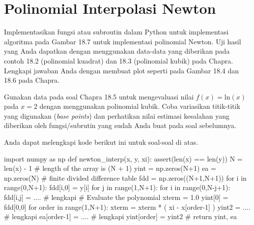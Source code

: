 \section{Polinomial Interpolasi Newton}

\begin{soal}
Implementasikan fungsi atau subroutin dalam Python untuk implementasi algoritma
pada Gambar 18.7 untuk implementasi polinomial Newton.
Uji hasil yang Anda dapatkan dengan menggunakan data-data yang diberikan pada contoh
18.2 (polinomial kuadrat) dan 18.3 (polinomial kubik) pada Chapra.
Lengkapi jawaban Anda dengan membuat plot seperti pada Gambar 18.4 dan 18.6 pada Chapra.
\end{soal}

\begin{soal}
Gunakan data pada soal Chapra 18.5 untuk mengevaluasi nilai $f(x) = \mathrm{ln}(x)$
pada $x = 2$ dengan menggunakan polinomial kubik. Coba variasikan titik-titik
yang digunakan (\textit{base points}) dan perhatikan nilai estimasi
kesalahan yang diberikan oleh
fungsi/subrutin yang sudah Anda buat pada soal sebelumnya.
\end{soal}

Anda dapat melengkapi kode berikut ini untuk soal-soal di atas.
\begin{pythoncode}
import numpy as np
def newton_interp(x, y, xi):
    assert(len(x) == len(y))
    N = len(x) - 1  # length of the array is (N + 1)
    yint = np.zeros(N+1)
    ea = np.zeros(N)
    # finite divided difference table
    fdd = np.zeros((N+1,N+1))
    for i in range(0,N+1):
        fdd[i,0] = y[i]
    for j in range(1,N+1):
        for i in range(0,N-j+1):
            fdd[i,j] = .... # lengkapi
    # Evaluate the polynomial
    xterm = 1.0
    yint[0] = fdd[0,0]  
    for order in range(1,N+1):
        xterm = xterm * ( xi - x[order-1] )
        yint2 = .... # lengkapi
        ea[order-1] = .... # lengkapi
        yint[order] = yint2 
    #
    return yint, ea  
\end{pythoncode}

